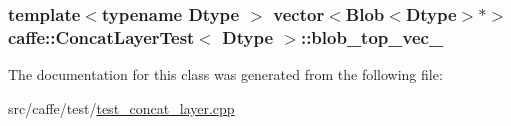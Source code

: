 \hypertarget{classcaffe_1_1_concat_layer_test_ae891c1b8f80cebc4db0c50b2a8e958db}{
\subsubsection[{blob\+\_\+top\+\_\+vec\+\_\+}]{\setlength{\rightskip}{0pt plus 5cm}template$<$typename Dtype $>$ vector$<${\bf Blob}$<$Dtype$>$$\ast$$>$ {\bf caffe\+::\+Concat\+Layer\+Test}$<$ Dtype $>$\+::blob\+\_\+top\+\_\+vec\+\_\+\hspace{0.3cm}{\ttfamily [protected]}}}\label{classcaffe_1_1_concat_layer_test_ae891c1b8f80cebc4db0c50b2a8e958db}


The documentation for this class was generated from the following file\+:\begin{DoxyCompactItemize}
\item 
src/caffe/test/\hyperlink{test__concat__layer_8cpp}{test\+\_\+concat\+\_\+layer.\+cpp}\end{DoxyCompactItemize}
